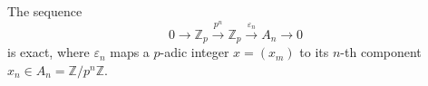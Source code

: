 The sequence
$$0 \rightarrow \mathbb{Z}_p \xrightarrow{p^n} \mathbb{Z}_p \xrightarrow{\varepsilon_n} A_n \rightarrow 0$$
is exact, where $\varepsilon_n$ maps a $p$-adic integer $x = (x_m)$ to its $n$-th component $x_n \in A_n = \mathbb{Z}/p^n\mathbb{Z}$.
